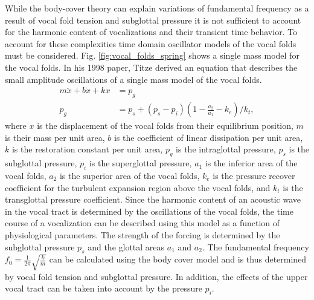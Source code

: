 \documentclass[12pt, letter]{report}
\begin{document}
While the body-cover theory can explain variations of fundamental frequency as a result of vocal fold tension and subglottal pressure it is not sufficient to account for the harmonic content of vocalizations and their transient time behavior. To account for these complexities time domain oscillator models of the vocal folds must be considered. Fig. \ref{fig:vocal_folds_spring} shows a single mass model for the vocal folds. In his 1998 paper, Titze derived an equation that describes the small amplitude oscillations of a single mass model of the vocal folds.
\begin{equation} 
\begin{split}
m \ddot{x} + b \dot{x} + k x &= p_g \\
p_g &= p_s + (p_s - p_i) \left( 1 - \frac{a_2}{a_1} - k_e \right) / k_t,
\end{split}
\end{equation}
where $x$ is the displacement of the vocal folds from their equilibrium position, $m$ is their mass per unit area, $b$ is the coefficient of linear dissipation per unit area, $k$ is the restoration constant per unit area, $p_g$ is the intraglottal pressure, $p_s$ is the subglottal pressure, $p_i$ is the superglottal pressure, $a_1$ is the inferior area of the vocal folds, $a_2$ is the superior area of the vocal folds, $k_e$ is the pressure recover coefficient for the turbulent expansion region above the vocal folds, and $k_t$ is the transglottal pressure coefficient. Since the harmonic content of an acoustic wave in the vocal tract is determined by the oscillations of the vocal folds, the time course of a vocalization can be described using this model as a function of physiological parameters. The strength of the forcing is determined by the subglottal pressure $p_s$ and the glottal areas $a_1$ and $a_2$. The fundamental frequency $f_0 = \frac{1}{2 \pi} \sqrt{\frac{k}{m}}$ can be calculated using the body cover model and is thus determined by vocal fold tension and subglottal pressure. In addition, the effects of the upper vocal tract can be taken into account by the pressure $p_i$.    
\end{document}
